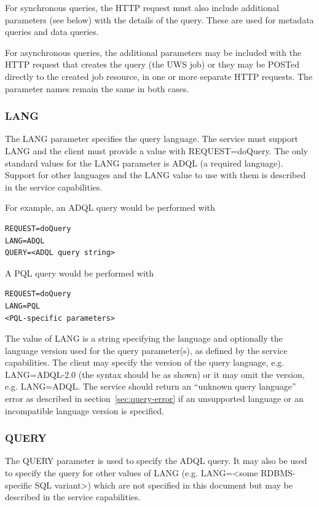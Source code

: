 \documentclass[11pt,letter]{ivoa}
\begin{document}
For synchronous queries, the HTTP request must also include additional 
parameters (see below) with the details of the query. These are used for 
metadata queries and data queries.

For asynchronous queries, the additional parameters may be included with the 
HTTP request that creates the query (the UWS job) or they may be POSTed directly 
to the created job resource, in one or more separate HTTP requests. The 
parameter names remain the same in both cases.

\subsubsection{LANG}
\label{sec:LANG}

The LANG parameter specifies the query language. The service must support LANG 
and the client must provide a value with REQUEST=doQuery. The only standard 
values for the LANG parameter is ADQL (a required language). Support for other 
languages and the LANG value to use with them is described in the service 
capabilities.

For example, an ADQL query would be performed with
\begin{verbatim}
REQUEST=doQuery
LANG=ADQL
QUERY=<ADQL query string>
\end{verbatim}
A PQL query would be performed with
\begin{verbatim}
REQUEST=doQuery
LANG=PQL
<PQL-specific parameters>
\end{verbatim}
The value of LANG is a string specifying the language and optionally the 
language version used for the query parameter(s), as defined by the service 
capabilities.  The client may specify the version of the query language,  e.g. 
LANG=ADQL-2.0 (the syntax should be as shown) or it may omit the version, e.g. 
LANG=ADQL.  The service should return an “unknown query language” error as 
described in section~\ref{sec:query-error} if an unsupported language or an incompatible 
language version is specified.

\subsubsection{QUERY}
\label{sec:QUERY}

The QUERY parameter is used to specify the ADQL query. It may also be used to 
specify the query for other values of LANG (e.g. LANG=<some RDBMS-specific SQL 
variant>) which are not specified in this document but may be described in the 
service capabilities.
\end{document}
